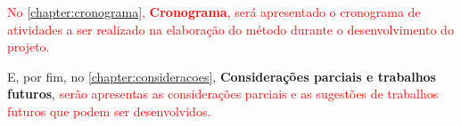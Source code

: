 \par
\textcolor{red}{No \autoref{chapter:cronograma}, \textbf{Cronograma}, será apresentado o cronograma de atividades a ser realizado na elaboração do método durante o desenvolvimento do projeto.}

\par

\par
E, por fim, no \autoref{chapter:consideracoes}, \textbf{Considerações parciais e trabalhos futuros}, \textcolor{red}{serão apresentas as considerações parciais e as sugestões de trabalhos futuros que podem ser desenvolvidos.} 
